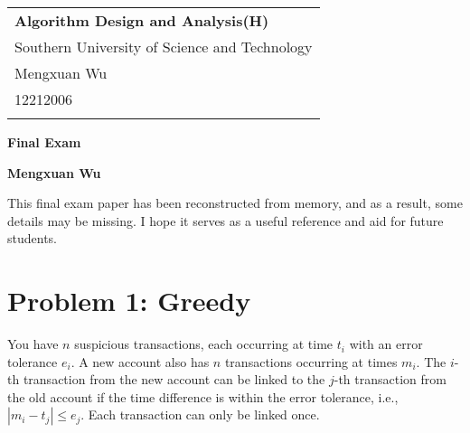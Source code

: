 \documentclass[a4paper,12pt]{article}
\begin{document}



\thispagestyle{empty} %

\begin{tabular}{p{15.5cm}}
{\large \bf Algorithm Design and Analysis(H)} \\
Southern University of Science and Technology \\ Mengxuan Wu \\ 12212006 \\
\hline
\\
\end{tabular}

\vspace*{0.3cm} %

\begin{center}
	{\Large \bf Final Exam}
	\vspace{2mm}

	{\bf Mengxuan Wu}
		
\end{center}  

\vspace{0.4cm}

This final exam paper has been reconstructed from memory, and as a result, some details may be missing. I hope it serves as a useful reference and aid for future students.

\section*{Problem 1: Greedy}

You have $n$ suspicious transactions, each occurring at time $t_i$ with an error tolerance $e_i$. A new account also has $n$ transactions occurring at times $m_i$. The $i$-th transaction from the new account can be linked to the $j$-th transaction from the old account if the time difference is within the error tolerance, i.e., $|m_i - t_j| \leq e_j$. Each transaction can only be linked once.
\end{document}
